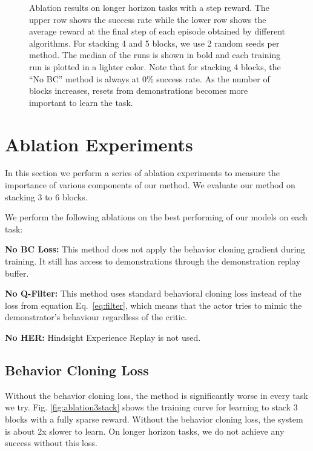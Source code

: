 \documentclass[letterpaper, 10 pt, conference]{ieeeconf}  %
\begin{document}
\begin{figure}[t]
    \caption{Ablation results on longer horizon tasks with a step reward. The upper row shows the success rate while the lower row shows the  average reward at the final step of each episode obtained by different algorithms. For stacking 4 and 5 blocks, we use 2 random seeds per method. The median of the runs is shown in bold and each training run is plotted in a lighter color. Note that for stacking 4 blocks, the ``No BC'' method is always at 0\% success rate. As the number of blocks increases, resets from demonstrations becomes more important to learn the task. }%
    \label{fig:step1}%
\end{figure}

\section{Ablation Experiments}
\label{sec:ablations}

In this section we perform a series of ablation experiments to measure the importance of various components of our method. We evaluate our method on stacking 3 to 6 blocks.

We perform the following ablations on the best performing of our models on each task:

\noindent \textbf{No BC Loss:} This method does not apply the behavior cloning gradient during training. It still has access to demonstrations through the demonstration replay buffer.

\noindent \textbf{No Q-Filter:} This method uses standard behavioral cloning loss instead of the loss from equation Eq.~\ref{eq:filter}, which means that the actor tries to mimic the demonstrator's behaviour
regardless of the critic.

\noindent \textbf{No HER:} Hindsight Experience Replay is not used.

\subsection{Behavior Cloning Loss}

Without the behavior cloning loss, the method is significantly worse in every task we try. Fig. \ref{fig:ablation3stack} shows the training curve for learning to stack 3 blocks with a fully sparse reward. Without the behavior cloning loss, the system is about 2x slower to learn. On longer horizon tasks, we do not achieve any success without this loss.
\end{document}
